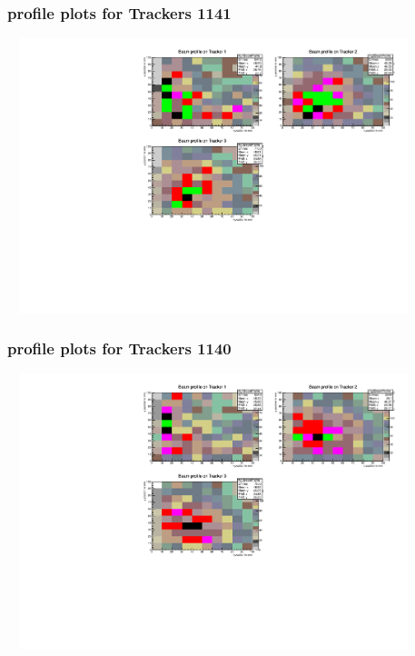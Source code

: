 \documentclass[slidestop,compress,mathserif]{beamer}
\begin{document}
\begin{frame}\frametitle{profile plots for Trackers 1141}
	 \includegraphics[width=12cm,height=8cm]{profile_plots_for_Trackers_1141.pdf}
\end{frame}
\begin{frame}\frametitle{profile plots for Trackers 1140}
	 \includegraphics[width=12cm,height=8cm]{profile_plots_for_Trackers_1140.pdf}
\end{frame}
\end{document}
